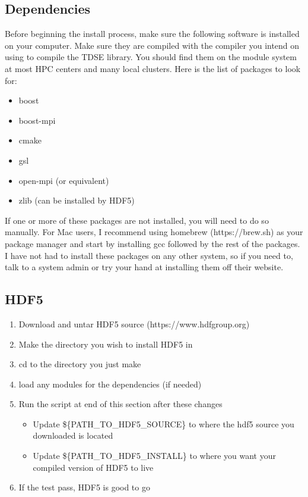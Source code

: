 \documentclass{article}
\begin{document}
\subsection{Dependencies} %
\label{sub:dependencies}
Before beginning the install process, make sure the following software is installed on your computer. Make sure they are compiled with the compiler you intend on using to compile the TDSE library. You should find them on the module system at most HPC centers and many local clusters. Here is the list of packages to look for:
\begin{itemize}
  \item boost  
  \item boost-mpi 
  \item cmake
  \item gsl   
  \item open-mpi (or equivalent)
  \item zlib (can be installed by HDF5)
\end{itemize}
If one or more of these packages are not installed, you will need to do so manually. For Mac users, I recommend using homebrew (https://brew.sh) as your package manager and start by installing gcc followed by the rest of the packages. I have not had to install these packages on any other system, so if you need to, talk to a system admin or try your hand at installing them off their website.

\subsection{HDF5} %
\label{sub:hdf5}
\begin{enumerate}
  \item Download and untar HDF5 source (https://www.hdfgroup.org)
  \item Make the directory you wish to install HDF5 in
  \item cd to the directory you just make
  \item load any modules for the dependencies (if needed)
  \item Run the script at end of this section after these changes
  \begin{itemize}
    \item Update \$\{PATH\_TO\_HDF5\_SOURCE\} to where the hdf5 source you downloaded is located
    \item Update \$\{PATH\_TO\_HDF5\_INSTALL\} to where you want your compiled version of HDF5 to live
  \end{itemize}
  \item If the test pass, HDF5 is good to go
\end{enumerate}
\end{document}
